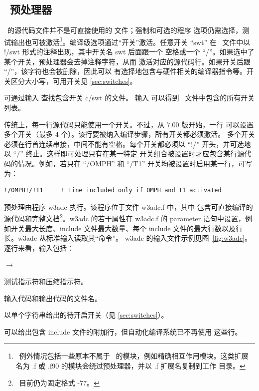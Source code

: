 \vssub
\subsection{~预处理器} \label{sec:w3adc}
\vssub

\ws\ 的源代码文件并不是可直接使用的 {\fortran} 文件；强制和可选的程序
选项仍需选择，测试输出也可被激活\footnote{~例外情况包括一些原本不属于
  \ws\ 的模块，例如精确相互作用模块。这类扩展名为 {\file .f} 或
  {\file .f90} 的模块会绕过预处理器，并以 {\file .f} 扩展名复制到工作
  目录。}。编译级选项通过“开关”激活。任意开关 ``{\F swt}'' 在
\ws\ 文件中以 {\F !/swt} 形式的注释出现，其中开关名 {\F swt} 后面跟一个
空格或一个 ``{\F /}''。如果选中了某个开关，预处理器会去掉注释字符，从而
激活对应的源代码行。如果开关后跟 ``{\F/}''，该字符也会被删除，因此可以
有选择地包含与硬件相关的编译器指令等。开关区分大小写，可用开关见
\para\ref{sec:switches}。

可通过输入  查找包含开关 {\F c/swt} 的文件。
输入  可以得到 \ws\ 文件中包含的所有开关列表。

\pb
\noindent
传统上，每一行源代码只能使用一个开关。不过，从 {\ww} 7.00 版开始，一行
可以设置多个开关（最多 4 个）。该行要被纳入编译步骤，所有开关都必须激活。
多个开关必须在行首连续串接，中间不能有空格。每个开关都必须以
``{\F !/}'' 开头，并可选地以 ``{\F /}'' 终止。这样即可处理只有在某一特定
开关组合被设置时才应包含某行源代码的情况。例如，若只在 ``{\F /OMPH}''
和 ``{\F /T1}'' 开关均被设置时启用某一行，可写为：

\begin{footnotesize}
\begin{verbatim}
!/OMPH!/!T1     ! Line included only if OMPH and T1 activated
\end{verbatim}
\end{footnotesize}

\pb
\noindent
预处理由程序 {\code w3adc} 执行。该程序位于文件 {\file w3adc.f} 中，其中
包含可直接编译的 {\fortran} 源代码和完整文档\footnote{~目前仍为固定格式
  {\fortran}-77。}。{\code w3adc} 的若干属性在 {\file w3adc.f} 的
{\F parameter} 语句中设置，例如开关最大长度、include 文件最大数量、每个
include 文件的最大行数以及行长。{\code w3adc} 从标准输入读取其“命令”。
{\code w3adc} 的输入文件示例见图~\ref{fig:w3adc}。逐行来看，输入包括：

\begin{list}{$\rightarrow$}{\itemsep 0mm \parsep 0mm}
\item	测试指示符和压缩指示符。
\item	输入代码和输出代码的文件名。
\item	以单个字符串给出的待开启开关（见 \para\ref{sec:switches}）。
\item   可以给出包含 include 文件的附加行，但自动化编译系统已不再使用
        这些行。
\end{list}

